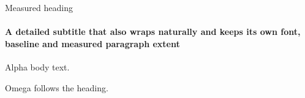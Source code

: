 \documentclass[11pt,aspectratio=43]{beamer}
\date{}
\begin{document}
\begin{frame}[t]{Measured heading}
\framesubtitle{A detailed subtitle that also wraps naturally and keeps its own font, baseline and measured paragraph extent}
Alpha body text.

Omega follows the heading.
\end{frame}
\end{document}
